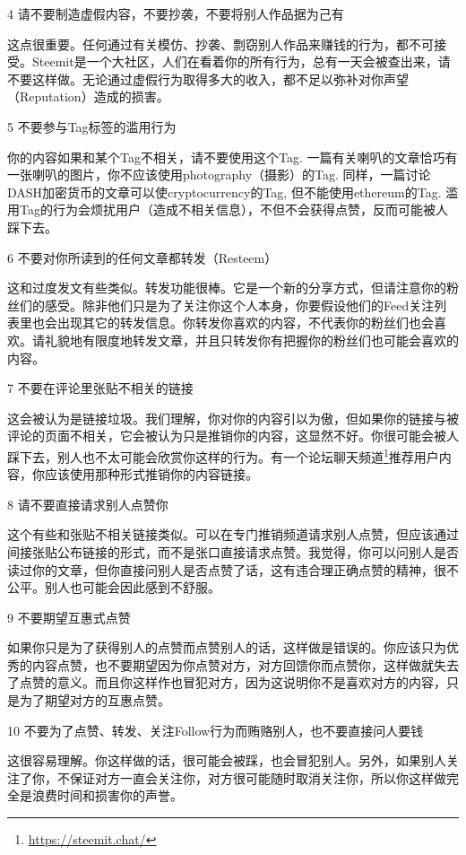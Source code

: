 \documentclass[]{ctexbook}
\renewcommand{\href}[2]{#2\footnote{\url{#1}}}
\begin{document}
4 请不要制造虚假内容，不要抄袭，不要将别人作品据为己有

这点很重要。任何通过有关模仿、抄袭、剽窃别人作品来赚钱的行为，都不可接受。Steemit是一个大社区，人们在看着你的所有行为，总有一天会被查出来，请不要这样做。无论通过虚假行为取得多大的收入，都不足以弥补对你声望（Reputation）造成的损害。

5 不要参与Tag标签的滥用行为

你的内容如果和某个Tag不相关，请不要使用这个Tag. 一篇有关喇叭的文章恰巧有一张喇叭的图片，你不应该使用photography（摄影）的Tag. 同样，一篇讨论DASH加密货币的文章可以使cryptocurrency的Tag, 但不能使用ethereum的Tag. 滥用Tag的行为会烦扰用户（造成不相关信息），不但不会获得点赞，反而可能被人踩下去。

6 不要对你所读到的任何文章都转发（Resteem）

这和过度发文有些类似。转发功能很棒。它是一个新的分享方式，但请注意你的粉丝们的感受。除非他们只是为了关注你这个人本身，你要假设他们的Feed关注列表里也会出现其它的转发信息。你转发你喜欢的内容，不代表你的粉丝们也会喜欢。请礼貌地有限度地转发文章，并且只转发你有把握你的粉丝们也可能会喜欢的内容。

7 不要在评论里张贴不相关的链接

这会被认为是链接垃圾。我们理解，你对你的内容引以为傲，但如果你的链接与被评论的页面不相关，它会被认为只是推销你的内容，这显然不好。你很可能会被人踩下去，别人也不太可能会欣赏你这样的行为。有一个\href{https://steemit.chat/}{论坛聊天频道}推荐用户内容，你应该使用那种形式推销你的内容链接。

8 请不要直接请求别人点赞你

这个有些和张贴不相关链接类似。可以在专门推销频道请求别人点赞，但应该通过间接张贴公布链接的形式，而不是张口直接请求点赞。我觉得，你可以问别人是否读过你的文章，但你直接问别人是否点赞了话，这有违合理正确点赞的精神，很不公平。别人也可能会因此感到不舒服。

9 不要期望互惠式点赞

如果你只是为了获得别人的点赞而点赞别人的话，这样做是错误的。你应该只为优秀的内容点赞，也不要期望因为你点赞对方，对方回馈你而点赞你，这样做就失去了点赞的意义。而且你这样作也冒犯对方，因为这说明你不是喜欢对方的内容，只是为了期望对方的互惠点赞。

10 不要为了点赞、转发、关注Follow行为而贿赂别人，也不要直接问人要钱

这很容易理解。你这样做的话，很可能会被踩，也会冒犯别人。另外，如果别人关注了你，不保证对方一直会关注你，对方很可能随时取消关注你，所以你这样做完全是浪费时间和损害你的声誉。
\end{document}
